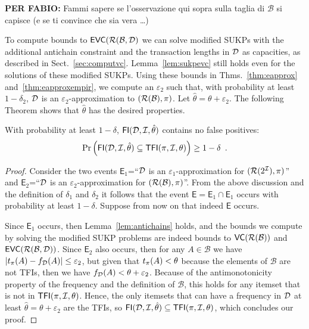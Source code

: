 {\bf PER FABIO:} Fammi sapere se l'osservazione qui sopra sulla taglia di
$\mathcal{B}$ si capisce (e se ti convince che sia vera \ldots)

To compute bounds to $\mathsf{EVC}(\mathcal{R}(\mathcal{B},{\cal D})$ we can solve modified SUKPs
with the additional antichain constraint and the transaction lengths in ${\cal D}$ as
capacities, as described in Sect.~\ref{sec:computvc}. Lemma~\ref{lem:sukpevc}
still holds even for the solutions of these modified SUKPs. Using these bounds
in Thms.~\ref{thm:eapprox} and~\ref{thm:eapproxempir}, we compute an
$\varepsilon_2$ such that, with probability at least $1-\delta_2$, ${\cal D}$ is an
$\varepsilon_2$-approximation to $(\mathcal{R}(\mathcal{B}),\pi)$. Let
$\hat{\theta}=\theta+\varepsilon_2$. The following Theorem shows that
$\hat{\theta}$ has the desired properties.

\begin{theorem}\label{lem:vcfull}
With probability at least $1-\delta$, $\mathsf{FI}({\cal D},{\cal I},\hat\theta)$ contains no false positives:
\[
\Pr\left(\mathsf{FI}({\cal D},{\cal I},\hat\theta)\subseteq\mathsf{TFI}(\pi,{\cal I},\theta)\right)\ge 1-\delta\enspace.\]
\end{theorem}
\begin{proof}
  Consider the two events $\mathsf{E}_1$=``${\cal D}$ is an
  $\varepsilon_1$-approximation for $(\mathcal{R}(2^{\cal I}),\pi)$'' and
  $\mathsf{E}_2$=``${\cal D}$ is an $\varepsilon_2$-approximation for
  $(\mathcal{R}(\mathcal{B}),\pi)$''. From the above discussion and the definition
  of $\delta_1$ and $\delta_2$ it follows that the event
  $\mathsf{E}=\mathsf{E}_1\cap\mathsf{E}_1$ occurs with probability at least
  $1-\delta$. Suppose from now on that indeed $\mathsf{E}$ occurs.

  Since $\mathsf{E}_1$ occurs, then Lemma~\ref{lem:antichains} holds, and the
  bounds we compute by solving the modified SUKP problems are indeed bounds to
  $\mathsf{VC}(\mathcal{R}(\mathcal{B}))$ and $\mathsf{EVC}(\mathcal{R}(\mathcal{B},{\cal D}))$. %
  Since $\mathsf{E}_2$ also occurs, then for any $A\in\mathcal{B}$ we have
  $|t_\pi(A)-f_{\cal D}(A)|\le\varepsilon_2$, but given that $t_\pi(A)<\theta$
  because the elements of $\mathcal{B}$ are not TFIs, then we have
  $f_{\cal D}(A)<\theta+\varepsilon_2$. Because of the antimonotonicity property of
  the frequency and the definition of $\mathcal{B}$, this holds for any itemset
  that is not in $\mathsf{TFI}(\pi,{\cal I},\theta)$. Hence, the only itemsets that can
  have a frequency in ${\cal D}$ at least $\hat{\theta}=\theta+\varepsilon_2$ are the
  TFIs, so $\mathsf{FI}({\cal D},{\cal I},\hat{\theta})\subseteq\mathsf{TFI}(\pi,{\cal I},\theta)$, which
  concludes our proof.
\end{proof}

